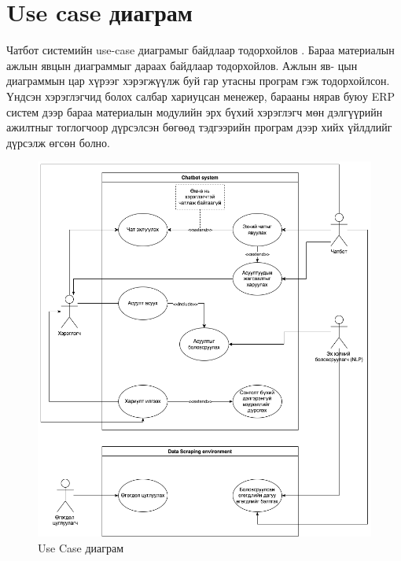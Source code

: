 \section{Use case диаграм}
Чатбот системийн use-case диаграмыг байдлаар тодорхойлов \cite{useCase}. Бараа материалын ажлын явцын диаграммыг дараах байдлаар тодорхойлов. Ажлын яв- цын диаграммын цар хүрээг хэрэгжүүлж буй гар утасны програм гэж тодорхойлсон. Үндсэн хэрэглэгчид болох салбар хариуцсан менежер, барааны нярав буюу ERP систем дээр бараа материалын модулийн эрх бүхий хэрэглэгч мөн дэлгүүрийн ажилтныг тоглогчоор дүрсэлсэн бөгөөд тэдгээрийн програм дээр хийх үйлдлийг дүрсэлж өгсөн болно.
\begin{figure}[h]
  \centering
  \includegraphics[width=\textwidth]{images/useCase.png}
  \caption{Use Case диаграм}
  \label{fig:useCase}
\end{figure}
